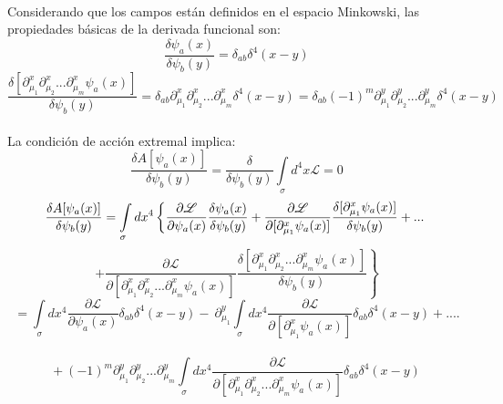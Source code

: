\documentclass[a4paper,12pt]{article}
\begin{document}
\\

Considerando que los campos están definidos en el espacio Minkowski, las propiedades básicas de la derivada funcional son:
\begin{equation}
\frac{\delta \psi_a(x)}{\delta \psi_b(y)}=\delta_{ab}\delta^4(x-y) 
\end{equation}
{\small
\begin{equation}
\frac{\delta [\partial_{\mu_1}^x\partial_{\mu_2}^x...\partial_{\mu_m}^x\psi_a(x)]}{\delta \psi_b(y) }=\delta_{ab}\partial_{\mu_1}^x\partial_{\mu_2}^x...\partial_{\mu_m}^x\delta^4(x-y)=\delta_{ab}(-1)^m\partial_{\mu_1}^y\partial_{\mu_2}^y...\partial_{\mu_m}^y\delta^4(x-y)
\end{equation}}\\
La condición de acción extremal implica:
\begin{equation}
\frac{\delta A[\psi_a(x)]}{\delta \psi_b(y)}=\frac{\delta}{\delta \psi_b(y)}\int\limits_{\sigma}d^4 x \mathscr{L}=0
\end{equation}
\begin{equation}
\frac{\delta A[\psi_a(x)]}{\delta \psi_b(y)}=\int\limits_{\sigma}dx^4\left\{\frac{\partial\mathscr{L} }{\partial \psi_a(x) }\frac{\delta \psi_a(x) }{\delta \psi_b(y)}+\frac{\partial \mathscr{L}}{\partial[\partial _{\mu_1}^x\psi_a(x)]}\frac{\delta[\partial _{\mu_1}^x\psi_a(x)]}{\delta \psi_b(y)}+...\right.\\ 
\end{equation}
$$+\left.\frac{\partial \mathscr{L}}{\partial [\partial_{\mu_1}^x\partial_{\mu_2}^x...\partial_{\mu_m}^x\psi_a(x)]}\frac{\delta [\partial_{\mu_1}^x\partial_{\mu_2}^x...\partial_{\mu_m}^x\psi_a(x)]}{\delta \psi_b(y) } \right\}$$
\begin{equation}
=\int\limits_{\sigma}dx^4\frac{\partial\mathscr{L} }{\partial \psi_a(x) }\delta_{ab}\delta^4(x-y)-\ \partial_{\mu_1}^y\int\limits_{\sigma}dx^4\frac{\partial \mathscr{L}}{\partial[\partial _{\mu_1}^x\psi_a(x)]}\delta_{ab} \delta^4(x-y)+.... 
\end{equation}
\\$$+\ (-1)^m\partial_{\mu_1}^y\partial_{\mu_2}^y...\partial_{\mu_m}^y\int\limits_{\sigma}dx^4\frac{\partial \mathscr{L}}{\partial [\partial_{\mu_1}^x\partial_{\mu_2}^x...\partial_{\mu_m}^x\psi_a(x)]}\delta_{ab}\delta^4(x-y)$$
\end{document}
